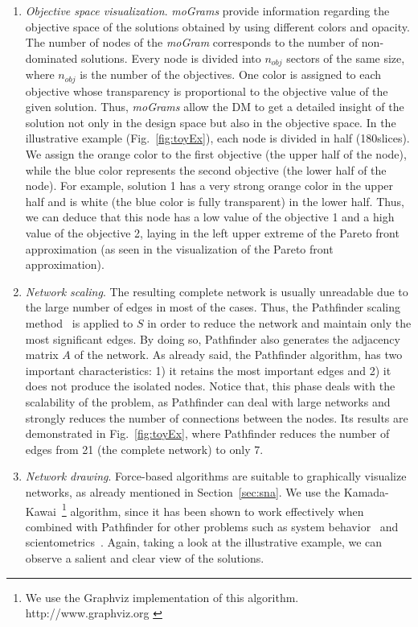 \documentclass[journal]{IEEEtran}
\begin{document}
\begin{enumerate}
 \item \emph{Objective space visualization}. \emph{moGrams} provide information regarding the objective space of the solutions obtained by using different colors and opacity. 
The number of nodes of the \emph{moGram} corresponds to the number of non-dominated solutions. Every node is divided into $n_{obj}$ sectors of the same size, where $n_{obj}$ is the number of the objectives. One color is assigned to each objective whose transparency is proportional to the objective value of the given solution. Thus, \emph{moGrams} allow the DM to get a detailed insight of the solution not only in the design space but also in the objective space. 
 In the illustrative example (Fig.~\ref{fig:toyEx}), each node is divided in half (180\degree slices). We assign the orange color to the first objective (the upper half of the node), while the blue color represents the second objective (the lower half of the node). For example, solution 1 has a very strong orange color in the upper half and is white (the blue color is fully transparent) in the lower half. Thus, we can deduce that this node has a low value of the objective 1 and a high value of the objective 2, laying in the left upper extreme of the Pareto front approximation (as seen in the visualization of the Pareto front approximation). 

 \item \emph{Network scaling}. The resulting complete network is usually unreadable due to the large number of edges in most of the cases. Thus, the Pathfinder scaling method~\cite{Dearholt90,Sch89} is applied to $S$ in order to reduce the network and maintain only the most significant edges. 
By doing so, Pathfinder also generates the adjacency matrix $A$ of the network. As already said, the Pathfinder algorithm, has two important characteristics: 1) it retains the most important edges and 2) it does not produce the isolated nodes. Notice that, this phase deals with the scalability of the problem, as Pathfinder can deal with large networks and strongly reduces the number of connections between the nodes. Its results are demonstrated in Fig.~\ref{fig:toyEx}, where Pathfinder reduces the number of edges from 21 (the complete network) to only 7. 

 \item \emph{Network drawing}. Force-based algorithms are suitable to graphically visualize networks, as already mentioned in Section~\ref{sec:sna}. We use the Kamada-Kawai~\footnote{We use the Graphviz implementation of this algorithm. http://www.graphviz.org \cite{Graphviz1999}} algorithm, since it has been shown to work effectively when combined with Pathfinder for other problems such as system behavior~\cite{PanchoIEEETFS2013} and scientometrics~\cite{MoyaAnegon07}. Again, taking a look at the illustrative example, we can observe a salient and clear view of the solutions.

\end{enumerate}
\end{document}
